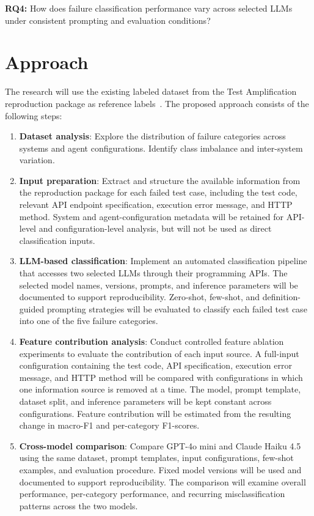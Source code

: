 \documentclass[12pt, a4paper]{article}
\begin{document}
\textbf{RQ4:} How does failure classification performance vary across
selected LLMs under consistent prompting and evaluation conditions?
\section{Approach}

The research will use the existing labeled dataset from the Test Amplification reproduction package as reference labels~\cite{testamplification}.
 The proposed approach consists of the following steps:
\begin{enumerate}[leftmargin=1.5em, itemsep=4pt]

    \item \textbf{Dataset analysis}: Explore the distribution of failure
    categories across systems and agent configurations. Identify class
    imbalance and inter-system variation.

 \item \textbf{Input preparation}: Extract and structure the available
information from the reproduction package for each failed test case,
including the test code, relevant API endpoint specification, execution
error message, and HTTP method. System and agent-configuration metadata
will be retained for API-level and configuration-level analysis, but will
not be used as direct classification inputs.

    \item \textbf{LLM-based classification}: Implement an automated
    classification pipeline that accesses two selected LLMs through their
    programming APIs. The selected model names, versions, prompts, and
    inference parameters will be documented to support reproducibility.
    Zero-shot, few-shot, and definition-guided prompting strategies will
    be evaluated to classify each failed test case into one of the five
    failure categories.~\cite{hannan2026fewshot}

    \item \textbf{Feature contribution analysis}: Conduct controlled
    feature ablation experiments to evaluate the contribution of each
    input source. A full-input configuration containing the test code,
    API specification, execution error message, and HTTP method will be
    compared with configurations in which one information source is
    removed at a time. The model, prompt template, dataset split, and
    inference parameters will be kept constant across configurations.
    Feature contribution will be estimated from the resulting change in
    macro-F1 and per-category F1-scores.
    \item \textbf{Cross-model comparison}: Compare GPT-4o mini and Claude
Haiku 4.5 using the same dataset, prompt templates, input configurations,
few-shot examples, and evaluation procedure. Fixed model versions will
be used and documented to support reproducibility. The comparison will
examine overall performance, per-category performance, and recurring
misclassification patterns across the two models.


\end{enumerate}
\end{document}
